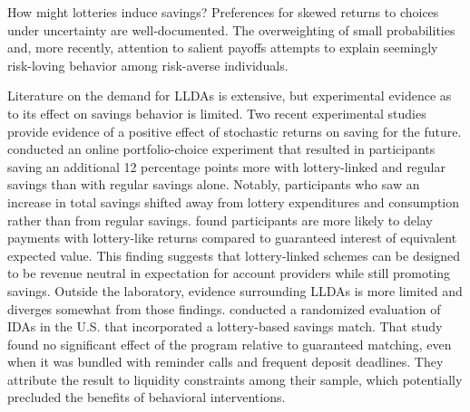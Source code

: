 \documentclass[12pt]{article}
\begin{document}
	How might lotteries induce savings? Preferences for skewed returns to choices under uncertainty are well-documented. The overweighting of small probabilities   and, more recently, attention to salient payoffs  attempts to explain seemingly risk-loving behavior among risk-averse individuals.  




	Literature on the demand for LLDAs is extensive, but experimental evidence as to its effect on savings behavior is limited. Two recent experimental studies provide evidence of a positive effect of stochastic returns on saving for the future.  conducted an online portfolio-choice experiment that resulted in participants saving an additional 12 percentage points more with lottery-linked and regular savings than with regular savings alone. Notably, participants who saw an increase in total savings shifted away from lottery expenditures and consumption rather than from regular savings.  found participants are more likely to delay payments with lottery-like returns compared to guaranteed interest of equivalent expected value. This finding suggests that lottery-linked schemes can be designed to be revenue neutral in expectation for account providers while still promoting savings. Outside the laboratory, evidence surrounding LLDAs is more limited and diverges somewhat from those findings.  conducted a randomized evaluation of IDAs in the U.S. that incorporated a lottery-based savings match. That study found no significant effect of the program relative to guaranteed matching, even when it was bundled with reminder calls and frequent deposit deadlines. They attribute the result to liquidity constraints among their sample, which potentially precluded the benefits of behavioral interventions.
\end{document}
